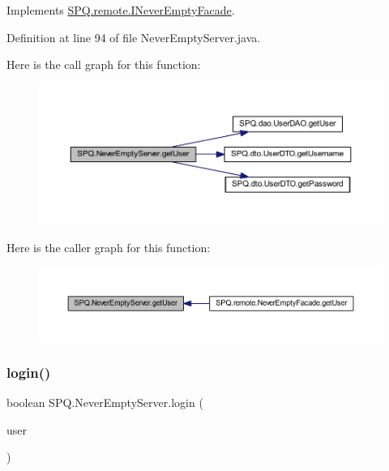 Implements \mbox{\hyperlink{interface_s_p_q_1_1remote_1_1_i_never_empty_facade_aa329dfc23ab0832e73802bf2df90b9e0}{S\+P\+Q.\+remote.\+I\+Never\+Empty\+Facade}}.



Definition at line 94 of file Never\+Empty\+Server.\+java.

Here is the call graph for this function\+:\nopagebreak
\begin{figure}[H]
\begin{center}
\leavevmode
\includegraphics[width=350pt]{class_s_p_q_1_1_never_empty_server_abb18bd0d72ecb8790068f206c592c58d_cgraph}
\end{center}
\end{figure}
Here is the caller graph for this function\+:\nopagebreak
\begin{figure}[H]
\begin{center}
\leavevmode
\includegraphics[width=350pt]{class_s_p_q_1_1_never_empty_server_abb18bd0d72ecb8790068f206c592c58d_icgraph}
\end{center}
\end{figure}
\mbox{\label{class_s_p_q_1_1_never_empty_server_a79e3b01cc25be204f24e01c7fccbef13}} 
\subsubsection{\texorpdfstring{login()}{login()}}
{\footnotesize\ttfamily boolean S\+P\+Q.\+Never\+Empty\+Server.\+login (\begin{DoxyParamCaption}\item[{\mbox{\hyperlink{class_s_p_q_1_1dto_1_1_user_d_t_o}{User\+D\+TO}}}]{user }\end{DoxyParamCaption})}

